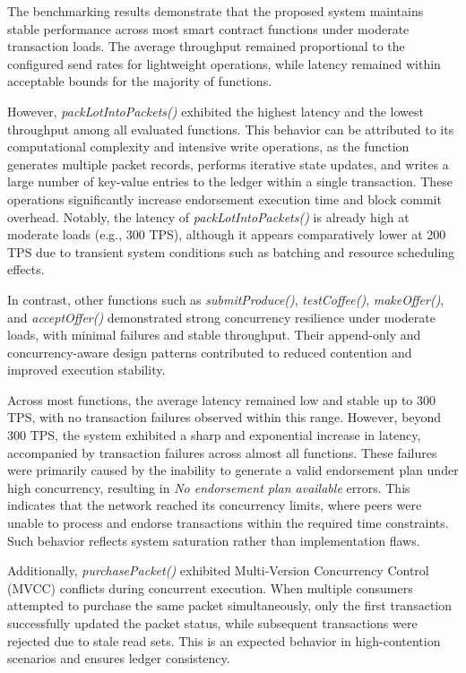 \documentclass[12pt]{article}
\begin{document}
	The benchmarking results demonstrate that the proposed system maintains stable performance across most smart contract functions under moderate transaction loads. The average throughput remained proportional to the configured send rates for lightweight operations, while latency remained within acceptable bounds for the majority of functions.
	
	However, \textit{packLotIntoPackets()} exhibited the highest latency and the lowest throughput among all evaluated functions. This behavior can be attributed to its computational complexity and intensive write operations, as the function generates multiple packet records, performs iterative state updates, and writes a large number of key-value entries to the ledger within a single transaction. These operations significantly increase endorsement execution time and block commit overhead. Notably, the latency of \textit{packLotIntoPackets()} is already high at moderate loads (e.g., 300 TPS), although it appears comparatively lower at 200 TPS due to transient system conditions such as batching and resource scheduling effects.
	
	In contrast, other functions such as \textit{submitProduce()}, \textit{testCoffee()}, \textit{makeOffer()}, and \textit{acceptOffer()} demonstrated strong concurrency resilience under moderate loads, with minimal failures and stable throughput. Their append-only and concurrency-aware design patterns contributed to reduced contention and improved execution stability.
	
	Across most functions, the average latency remained low and stable up to 300 TPS, with no transaction failures observed within this range. However, beyond 300 TPS, the system exhibited a sharp and exponential increase in latency, accompanied by transaction failures across almost all functions. These failures were primarily caused by the inability to generate a valid endorsement plan under high concurrency, resulting in \textit{No endorsement plan available} errors. This indicates that the network reached its concurrency limits, where peers were unable to process and endorse transactions within the required time constraints. Such behavior reflects system saturation rather than implementation flaws.
	
	Additionally, \textit{purchasePacket()} exhibited Multi-Version Concurrency Control (MVCC) conflicts during concurrent execution. When multiple consumers attempted to purchase the same packet simultaneously, only the first transaction successfully updated the packet status, while subsequent transactions were rejected due to stale read sets. This is an expected behavior in high-contention scenarios and ensures ledger consistency.
	
\end{document}
